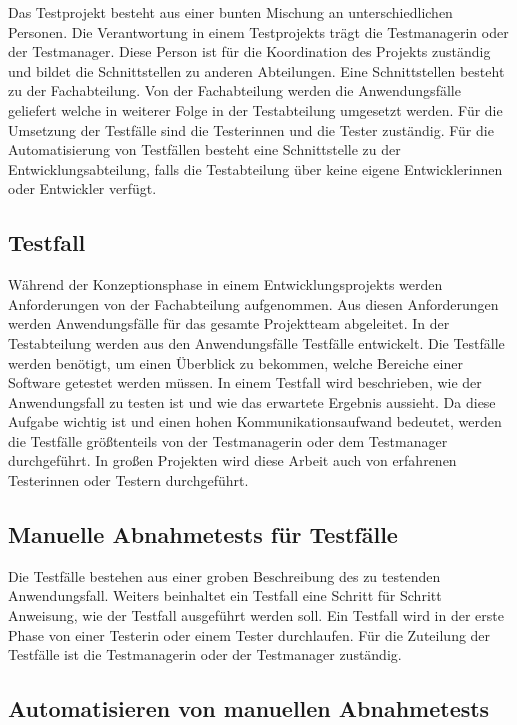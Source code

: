 Das Testprojekt besteht aus einer bunten Mischung an unterschiedlichen Personen. Die Verantwortung in einem Testprojekts trägt die Testmanagerin oder der Testmanager. Diese Person ist für die Koordination des Projekts zuständig und bildet die Schnittstellen zu anderen Abteilungen. Eine Schnittstellen besteht zu der Fachabteilung. Von der Fachabteilung werden die Anwendungsfälle geliefert welche in weiterer Folge in der Testabteilung umgesetzt werden. Für die Umsetzung der Testfälle sind die Testerinnen und die Tester zuständig. Für die Automatisierung von Testfällen besteht eine Schnittstelle zu der Entwicklungsabteilung, falls die Testabteilung über keine eigene Entwicklerinnen oder Entwickler verfügt.

\subsection{Testfall}

Während der Konzeptionsphase in einem Entwicklungsprojekts werden Anforderungen von der Fachabteilung aufgenommen. Aus diesen Anforderungen werden Anwendungsfälle für das gesamte Projektteam abgeleitet. In der Testabteilung werden aus den Anwendungsfälle Testfälle entwickelt. Die Testfälle werden benötigt, um einen Überblick zu bekommen, welche Bereiche einer Software getestet werden müssen. In einem Testfall wird beschrieben, wie der Anwendungsfall zu testen ist und wie das erwartete Ergebnis aussieht. Da diese Aufgabe wichtig ist und einen hohen Kommunikationsaufwand bedeutet, werden die Testfälle größtenteils von der Testmanagerin oder dem Testmanager durchgeführt. In großen Projekten wird diese Arbeit auch von erfahrenen Testerinnen oder Testern durchgeführt. 

\subsection{Manuelle Abnahmetests für Testfälle}

Die Testfälle bestehen aus einer groben Beschreibung des zu testenden Anwendungsfall. Weiters beinhaltet ein Testfall eine Schritt für Schritt Anweisung, wie der Testfall ausgeführt werden soll. Ein Testfall wird in der erste Phase von einer Testerin oder einem Tester durchlaufen. Für die Zuteilung der Testfälle ist die Testmanagerin oder der Testmanager zuständig. 

\subsection{Automatisieren von manuellen Abnahmetests}

